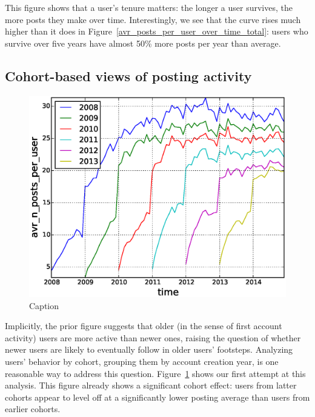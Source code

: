 This figure shows that a user's tenure matters: the longer a user survives, the more posts they make over time.  Interestingly, we see that the curve rises much higher than it does in Figure~\ref{avr_posts_per_user_over_time_total}: users who survive over five years have almost 50\% more posts per year than average. 

\subsection{Cohort-based views of posting activity}

\begin{figure}[!tb]
\centering
\includegraphics[scale=0.4]{./images/avr_posts_per_user_over_time_cohorts.eps}
\caption{Caption}
\label{fig:avr_posts_per_user_over_time_cohorts}
\end{figure}

Implicitly, the prior figure suggests that older (in the sense of first account activity) users are more active than newer ones, raising the question of whether newer users
are likely to eventually follow in older users' footsteps.  Analyzing users' behavior by cohort, grouping them by account creation year, is one reasonable way to address this question.  Figure~\ref{fig:avr_posts_per_user_over_time_cohorts} shows our first attempt at this analysis.  This figure already shows a significant cohort effect: users from latter cohorts appear to level off at a significantly lower posting average than users from earlier cohorts.  

